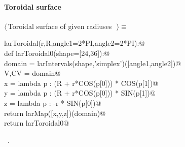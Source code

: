 \documentclass[11pt,oneside]{article}	%
\begin{document}
\paragraph{Toroidal surface}
\begin{flushleft} \small \label{scrap13}
$\langle\,$Toroidal surface of given radiuses\nobreak\ {\footnotesize {}}$\,\rangle\equiv$
\vspace{-1ex}
\begin{list}{}{} \item
\mbox{}\verb@def larToroidal(r,R,angle1=2*PI,angle2=2*PI):@\\
\mbox{}\verb@   def larToroidal0(shape=[24,36]):@\\
\mbox{}\verb@      domain = larIntervals(shape,'simplex')([angle1,angle2])@\\
\mbox{}\verb@      V,CV = domain@\\
\mbox{}\verb@      x = lambda p : (R + r*COS(p[0])) * COS(p[1])@\\
\mbox{}\verb@      y = lambda p : (R + r*COS(p[0])) * SIN(p[1])@\\
\mbox{}\verb@      z = lambda p : -r * SIN(p[0])@\\
\mbox{}\verb@      return larMap([x,y,z])(domain)@\\
\mbox{}\verb@   return larToroidal0@\\
\mbox{}\verb@@{\NWsep}
\end{list}
\vspace{-1ex}
\footnotesize\addtolength{\baselineskip}{-1ex}
\begin{list}{}{\setlength{\itemsep}{-\parsep}\setlength{\itemindent}{-\leftmargin}}
\item \NWtxtMacroRefIn\ .
\end{list}
\end{flushleft}
\end{document}
